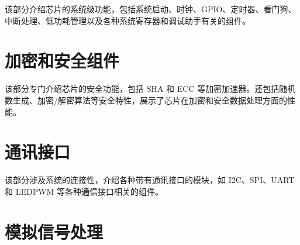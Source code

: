 \documentclass[openany, 10pt]{book}
\begin{document}

该部分介绍芯片的系统级功能，包括系统启动、时钟、GPIO、定时器、看门狗、中断处理、低功耗管理以及各种系统寄存器和调试助手有关的组件。


\part{加密和安全组件}

该部分专门介绍芯片的安全功能，包括 SHA 和 ECC 等加密加速器。还包括随机数生成、加密/解密算法等安全特性，展示了芯片在加密和安全数据处理方面的性能。






\part{通讯接口}

该部分涉及系统的连接性，介绍各种带有通讯接口的模块，如 I2C、SPI、UART 和 LEDPWM 等各种通信接口相关的组件。


\part{模拟信号处理}
\end{document}
